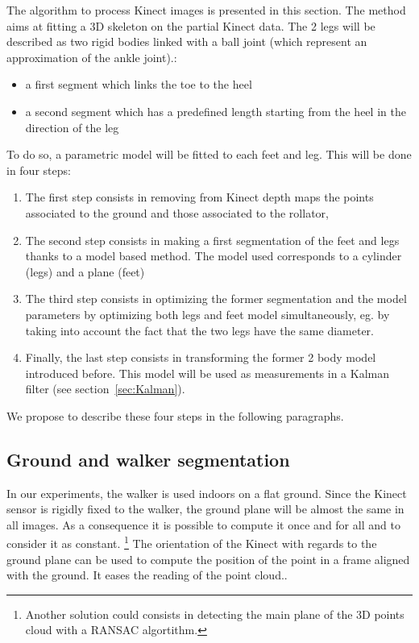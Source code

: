 \documentclass[letterpaper, 10 pt, conference]{ieeeconf}
\newcommand{\CDOK}[2]{{#1}} %
\begin{document}
The algorithm to process Kinect images is presented in this section. \CDOK{The method aims at fitting a 3D skeleton on the partial Kinect data. The 2 legs will be described as two rigid bodies linked with a ball joint (which represent an approximation of the ankle joint).}{The goal of the method is to segment  Kinect points cloud (see Fig.~\ref{fig:KinectFrames}) in two part (left and right) which are composed by}:
\begin{itemize}
	\item a first segment which links the toe to the heel
	\item a second segment which has a predefined length starting from the heel in the direction of the leg
\end{itemize}
\CDOK{To do so}{Moreover}, a \CDOK{parametric}{} model will be \CDOK{fitted}{fit} to each feet and leg. This will be done in four steps:
\begin{enumerate}
	\item The first step consists in removing from Kinect \CDOK{depth maps}{images} the points associated to the ground and those associated to the rollator,
	\item The second step consists in making a first segmentation of the feet and legs thanks to a model based method. The model used corresponds to a cylinder (legs) and a plane (feet)
	\item The third step consists in optimizing the former segmentation and the model parameters by optimizing both legs and feet model simultaneously, eg. by taking into account the fact that the two legs have the same diameter.
	\item Finally, the last step consists in transforming the former 2 body model introduced before. This model will be used as measurements in a Kalman filter (see section~\ref{sec:Kalman}).
\end{enumerate}
We propose to describe these four steps in the following paragraphs.

\subsection{Ground and walker segmentation}
\label{subsec:GroundWalkerSeg}
In our experiments, the walker is used indoors on a flat ground. Since the Kinect sensor is rigidly fixed to the walker, the ground plane will be almost the same in all images. As a consequence it is possible to compute it once and for all and to consider it as constant. \footnote{Another solution could consists in detecting the main plane of the 3D points cloud with a RANSAC algortithm.} \CDOK{The orientation of the Kinect with regards to the ground plane can be used to compute the position of the point in a frame aligned with the ground. It eases the reading of the point cloud.}{Moreover, a rotation matrix can be defined in order to change its orientation to an horizontal plane. At this step, we assume that the we apply this rotation matrix so that the $\mathbf{z}$ axis in the Kinect frame corresponds to the $\mathbf{z}$ axis of the world}.
\end{document}
